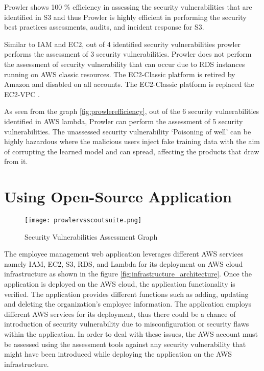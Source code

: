 \par Prowler shows 100 \% efficiency in assessing the security vulnerabilities that are identified in S3 and thus Prowler is highly efficient in performing the security best practices assessments, audits, and incident response for S3.

\par Similar to IAM and EC2, out of 4 identified security
vulnerabilities prowler performs the assessment of 3 security vulnerabilities.
Prowler does not perform the assessment of security vulnerability that can occur due to RDS instances running on AWS classic resources.
The EC2-Classic platform is retired by Amazon and disabled on all accounts.
The EC2-Classic platform is replaced the EC2-VPC \cite{88}.

\par As seen from the graph \ref{fig:prowlerefficiency}, out of the 6 security vulnerabilities identified in AWS lambda, Prowler can perform the assessment of 5 security vulnerabilities. The unassessed security vulnerability ‘Poisoning of well’ can be highly hazardous where the malicious users inject fake training data with the aim of corrupting the learned model and can spread, affecting the products that draw from it.

\section{Using Open-Source Application}

\begin{figure}
    \centering
    \texttt{[image: prowlervsscoutsuite.png]}
    \caption{Security Vulnerabilities Assessment Graph}
    \label{fig:prowlervsscoutsuite}
\end{figure}

\par The employee management web application leverages different AWS services namely IAM, EC2, S3, RDS, and Lambda for its deployment on AWS cloud infrastructure as shown in the figure \ref{fig:infrastructure_architecture}. Once the application is deployed on the AWS cloud, the application functionality is verified. The application provides different functions such as adding, updating and deleting the organization’s employee information. The application employs different AWS services for its deployment, thus there could be a chance of introduction of security vulnerability due to misconfiguration or security flaws within the application. In order to deal with these issues, the AWS account must be assessed using the assessment tools against any security vulnerability that might have been introduced while deploying the application on the AWS infrastructure.

